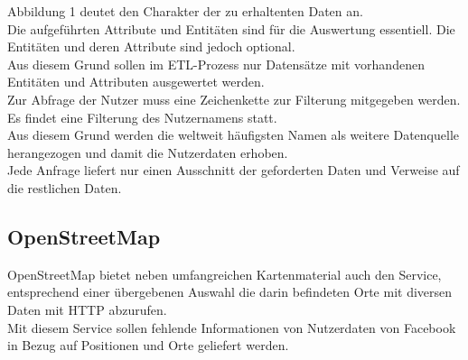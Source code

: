 \documentclass[a4paper,12pt]{scrartcl}
\begin{document}
Abbildung 1 deutet den Charakter der zu erhaltenten Daten an.\\
Die aufgeführten Attribute und Entitäten sind für die Auswertung essentiell. Die Entitäten und deren Attribute sind jedoch optional.\\
Aus diesem Grund sollen im ETL-Prozess nur Datensätze mit vorhandenen Entitäten und Attributen ausgewertet werden.\\

Zur Abfrage der Nutzer muss eine Zeichenkette zur Filterung mitgegeben werden. Es findet eine Filterung des Nutzernamens statt.\\
Aus diesem Grund werden die weltweit häufigsten Namen als weitere Datenquelle herangezogen und damit die Nutzerdaten erhoben.\\

Jede Anfrage liefert nur einen Ausschnitt der geforderten Daten und Verweise auf die restlichen Daten.


\subsection{OpenStreetMap}

OpenStreetMap bietet neben umfangreichen Kartenmaterial auch den Service, entsprechend einer übergebenen Auswahl die darin befindeten Orte mit diversen Daten mit HTTP abzurufen.\\
Mit diesem Service sollen fehlende Informationen von Nutzerdaten von Facebook in Bezug auf Positionen und Orte geliefert werden.
\end{document}
